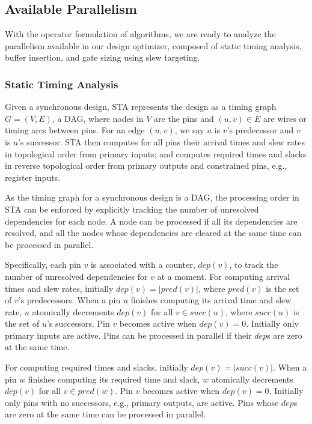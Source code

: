 \subsection{Available Parallelism}
\label{sec:avail_parallelism}

With the operator formulation of algorithms, we are ready to analyze the parallelism available in our design optimizer, composed of static timing analysis, buffer insertion, and gate sizing using slew targeting.

\subsubsection{Static Timing Analysis}
\label{sec:sta_parallel}

Given a synchronous design, STA represents the design as a timing graph $G = (V, E)$, a DAG, where nodes in $V$ are the pins and $(u, v) \in E$ are wires or timing arcs between pins. For an edge $(u, v)$, we say $u$ is $v$'s predecessor and $v$ is $u$'s successor. STA then computes for all pins their arrival times and slew rates in topological order from primary inputs; and computes required times and slacks in reverse topological order from primary outputs and constrained pins, e.g., register inputs.

As the timing graph for a synchronous design is a DAG, the processing order in STA can be enforced by explicitly tracking the number of unresolved dependencies for each node. A node can be processed if all its dependencies are resolved, and all the nodes whose dependencies are cleared at the same time can be processed in parallel.

Specifically, each pin $v$ is associated with a counter, $dep(v)$, to track the number of unresolved dependencies for $v$ at a moment. For computing arrival times and slew rates, initially $dep(v) = |pred(v)|$, where $pred(v)$ is the set of $v$'s predecessors. When a pin $u$ finishes computing its arrival time and slew rate, $u$ atomically decrements $dep(v)$ for all $v \in succ(u)$, where $succ(u)$ is the set of $u$'s successors. Pin $v$ becomes active when $dep(v) = 0$. Initially only primary inputs are active. Pins can be processed in parallel if their $dep$s are zero at the same time.

For computing required times and slacks, initially $dep(v) = |succ(v)|$. When a pin $w$ finishes computing its required time and slack, $w$ atomically decrements $dep(v)$ for all $v \in pred(w)$. Pin $v$ becomes active when $dep(v) = 0$. Initially only pins with no successors, e.g., primary outputs, are active. Pins whose $dep$s are zero at the same time can be processed in parallel.

